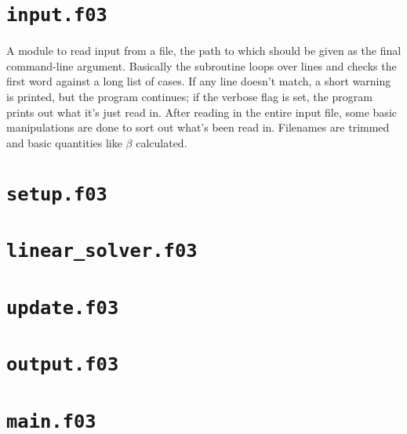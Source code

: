 \documentclass{article}
\begin{document}
\section*{\texttt{input.f03}}

A module to read input from a file, the path to which should be given as the final command-line argument.
Basically the subroutine loops over lines and checks the first word against a long list of cases.
If any line doesn't match, a short warning is printed, but the program continues; if the verbose flag is set, the program prints out what it's just read in.
After reading in the entire input file, some basic manipulations are done to sort out what's been read in.
Filenames are trimmed and basic quantities like $\beta$ calculated.

\section*{\texttt{setup.f03}}

\section*{\texttt{linear{\_}solver.f03}}

\section*{\texttt{update.f03}}

\section*{\texttt{output.f03}}

\section*{\texttt{main.f03}}
\end{document}
